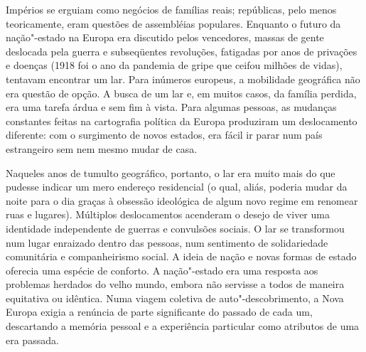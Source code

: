 Impérios se erguiam como negócios de famílias reais; repúblicas, pelo
menos teoricamente, eram questões de assembléias populares. Enquanto o
futuro da nação"-estado na Europa era discutido pelos vencedores, massas
de gente deslocada pela guerra e subseqüentes revoluções, fatigadas por
anos de privações e doenças (1918 foi o ano da pandemia de gripe que
ceifou milhões de vidas), tentavam encontrar um lar. Para inúmeros
europeus, a mobilidade geográfica não era questão de opção. A busca de
um lar e, em muitos casos, da família perdida, era uma tarefa árdua e
sem fim à vista. Para algumas pessoas, as mudanças constantes feitas na
cartografia política da Europa produziram um deslocamento diferente: com
o surgimento de novos estados, era fácil ir parar num país estrangeiro
sem nem mesmo mudar de casa.

Naqueles anos de tumulto geográfico, portanto, o lar era muito mais do
que pudesse indicar um mero endereço residencial (o qual, aliás, poderia
mudar da noite para o dia graças à obsessão ideológica de algum novo
regime em renomear ruas e lugares). Múltiplos deslocamentos acenderam o
desejo de viver uma identidade independente de guerras e convulsões
sociais. O lar se transformou num lugar enraizado dentro das pessoas,
num sentimento de solidariedade comunitária e companheirismo social. A
ideia de nação e novas formas de estado oferecia uma espécie de
conforto. A nação"-estado era uma resposta aos problemas herdados do
velho mundo, embora não servisse a todos de maneira equitativa ou
idêntica. Numa viagem coletiva de auto"-descobrimento, a Nova Europa
exigia a renúncia de parte significante do passado de cada um,
descartando a memória pessoal e a experiência particular como atributos
de uma era passada.

